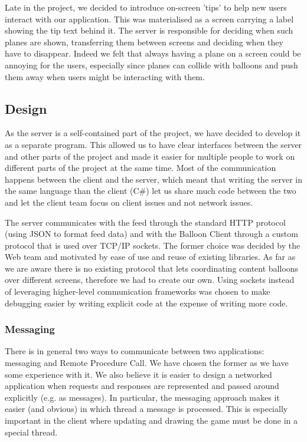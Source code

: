 Late in the project, we decided to introduce on-screen 'tips' to help new users
interact with our application. This was materialised as a screen carrying a label
showing the tip text behind it. The server is responsible for deciding when 
such planes are shown, transferring them between screens and deciding when they
have to disappear. Indeed we felt that always having a plane on a screen could
be annoying for the users, especially since planes can collide with balloons 
and push them away when users might be interacting with them.

\clearpage{}
\subsection{Design}

As the server is a self-contained part of the project, we have decided to 
develop it as a separate program. This allowed us to have clear interfaces 
between the server and other parts of the project and made it easier for
multiple people to work on different parts of the project at the same time.
Most of the communication happens between the client and the server, which 
meant that writing the server in the same language than the client (C\#) let us 
share much code between the two and let the client team focus on client issues 
and not network issues.

The server communicates with the feed through the standard HTTP protocol 
(using JSON to format feed data) and with the Balloon Client through a custom 
protocol that is used over TCP/IP sockets. The former choice was decided by the 
Web team and motivated by ease of use and reuse of existing libraries. As far 
as we are aware there is no existing protocol that lets coordinating content
balloons over different screens, therefore we had to create our own. Using 
sockets instead of leveraging higher-level communication frameworks was chosen 
to make debugging easier by writing explicit code at the expense of writing 
more code.

\subsubsection{Messaging}

There is in general two ways to communicate between two applications: messaging 
and Remote Procedure Call. We have chosen the former as we have some experience 
with it. We also believe it is easier to design a networked application when 
requests and responses are represented and passed around explicitly (e.g. as 
messages). In particular, the messaging approach makes it easier (and obvious) 
in which thread a message is processed. This is especially important in the 
client where updating and drawing the game must be done in a special thread.


